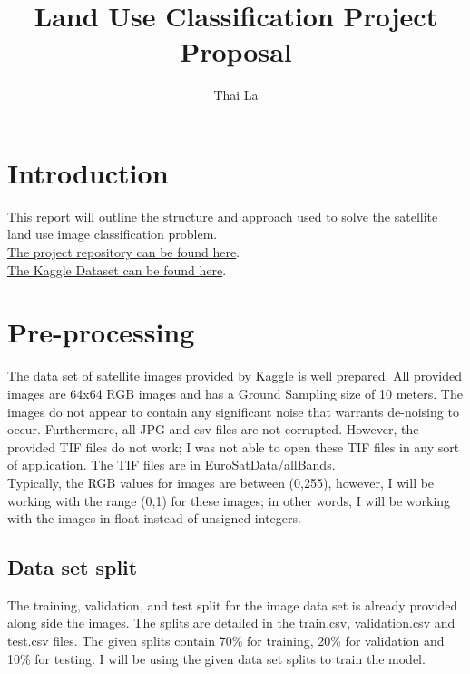 \documentclass[acmtog]{acmart}
\begin{document}
	\title{Land Use Classification Project Proposal}
	
	\author{Thai La}
	
	
	\maketitle
	
	\section{Introduction}
	This report will outline the structure and approach used to solve the satellite land use image classification problem.\\
	\href{https://git.cs.usask.ca/vtl932/cmpt318_course_project}{The project repository can be found here}.\\
	\href{https://www.kaggle.com/datasets/apollo2506/eurosat-dataset?select=EuroSAT}{The Kaggle Dataset can be found here}.
	
	\section{Pre-processing}
	The data set of satellite images provided by Kaggle is well prepared. All provided images are 64x64 RGB images and has a Ground Sampling size of 10 meters. The images do not appear to contain any significant noise that warrants de-noising to occur. Furthermore, all JPG and csv files are not corrupted. However, the provided TIF files do not work; I was not able to open these TIF files in any sort of application. The TIF files are in EuroSatData/allBands.\\
	Typically, the RGB values for images are between (0,255), however, I will be working with the range (0,1) for these images; in other words, I will be working with the images in float instead of unsigned integers.
	
		\subsection{Data set split}
		
		The training, validation, and test split for the image data set is already provided along side the images. The splits are detailed in the train.csv, validation.csv and test.csv files. The given splits contain 70\% for  training, 20\% for validation and 10\% for testing. I will be using the given data set splits to train the model.
	
\end{document}
